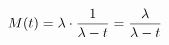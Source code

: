 \documentclass[preview]{standalone}
\begin{document}
\begin{align*}
\special{dvisvgm:raw <g id='unique000'>}M(t)=\lambda\cdot\dfrac{1}{\lambda-t}=\dfrac{\lambda}{\lambda-t}\special{dvisvgm:raw </g>}
\end{align*}
\end{document}
